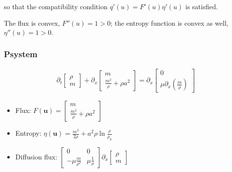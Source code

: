 \documentclass[letterpaper,10pt,english]{jupyterBook}
\begin{document}
\sphinxAtStartPar
so that the compatibility condition \(q'(u) = F'(u) \eta'(u)\) is satisfied.

\sphinxAtStartPar
The flux is convex, \(F''(u) = 1 > 0\); the entropy function is convex as well, \(\eta''(u) = 1 > 0\).
\subsubsection*{P\sphinxhyphen{}system}
\begin{equation*}
\begin{split}
\partial_t \begin{bmatrix} \rho \\ m \end{bmatrix}
+ \partial_x \begin{bmatrix} m \\ \frac{m^2}{\rho} + \rho a^2 \end{bmatrix} 
= \partial_x \begin{bmatrix} 0 \\ \mu \partial_x \left( \frac{m}{\rho} \right) \end{bmatrix}
\end{split}
\end{equation*}\begin{itemize}
\item {} 
\sphinxAtStartPar
Flux: \(F(\mathbf{u}) = \begin{bmatrix} m \\ \frac{m^2}{\rho} + \rho a^2 \end{bmatrix} \)

\item {} 
\sphinxAtStartPar
Entropy: \(\eta(\mathbf{u}) = \frac{m^2}{2 \rho} + a^2 \rho \ln \frac{\rho}{\rho_0}\)

\item {} 
\sphinxAtStartPar
Diffusion flux: \(\begin{bmatrix} 0 & 0 \\ - \mu \frac{m}{\rho^2} & \mu \frac{1}{\rho} \end{bmatrix} \partial_x \begin{bmatrix} \rho \\ m \end{bmatrix}\)

\end{itemize}
\end{document}
